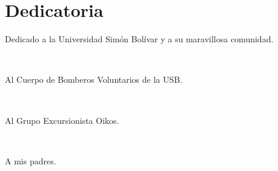 \chapter*{Dedicatoria}

\par Dedicado a la Universidad Simón Bolívar y a su maravillosa comunidad.
\par ~
\par Al Cuerpo de Bomberos Voluntarios de la USB.
\par ~
\par Al Grupo Excursionista Oikos.
\par ~
\par A mis padres.
